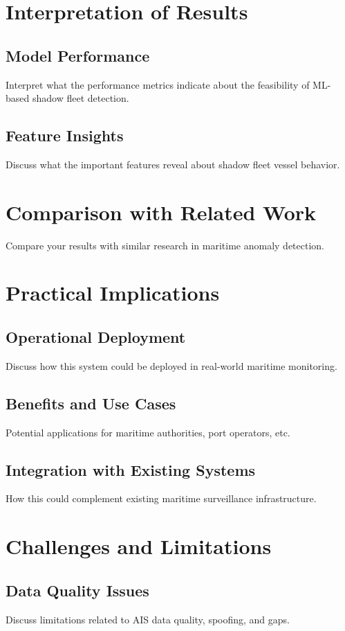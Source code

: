 
\section{Interpretation of Results}
\subsection{Model Performance}
Interpret what the performance metrics indicate about the feasibility of ML-based shadow fleet detection.

\subsection{Feature Insights}
Discuss what the important features reveal about shadow fleet vessel behavior.

\section{Comparison with Related Work}
Compare your results with similar research in maritime anomaly detection.

\section{Practical Implications}
\subsection{Operational Deployment}
Discuss how this system could be deployed in real-world maritime monitoring.

\subsection{Benefits and Use Cases}
Potential applications for maritime authorities, port operators, etc.

\subsection{Integration with Existing Systems}
How this could complement existing maritime surveillance infrastructure.

\section{Challenges and Limitations}
\subsection{Data Quality Issues}
Discuss limitations related to AIS data quality, spoofing, and gaps.

